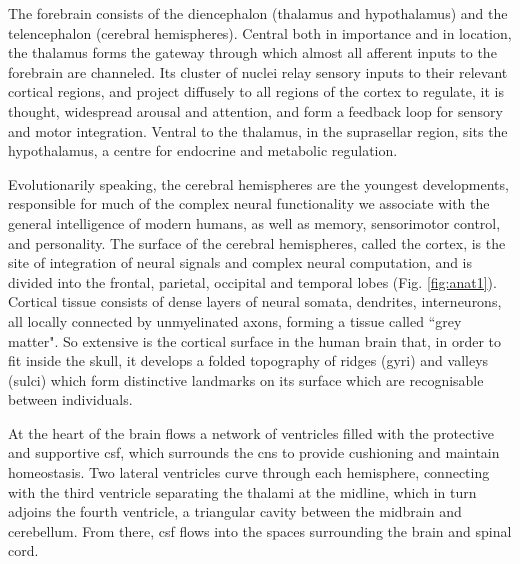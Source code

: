 \begin{SCfigure}[][h!]
  
  \caption[Macroscale subdivisions of the human brain]{Macroscale subdivisions of the human brain. Adapted from original by \citeauthor{Carter1918} (\citeyear{Carter1918}), public domain, via Wikimedia Commons.}
  \label{fig:anat1}
\end{SCfigure}

The forebrain consists of the diencephalon (thalamus and hypothalamus) and the telencephalon (cerebral hemispheres).
Central both in importance and in location, the thalamus forms the gateway through which almost all afferent inputs to the forebrain are channeled.
Its cluster of nuclei relay sensory inputs to their relevant cortical regions, and project diffusely to all regions of the cortex to regulate, it is thought, widespread arousal and attention, and form a feedback loop for sensory and motor integration.
Ventral to the thalamus, in the suprasellar region, sits the hypothalamus, a centre for endocrine and metabolic regulation.

Evolutionarily speaking, the cerebral hemispheres are the youngest developments, responsible for much of the complex neural functionality we associate with the general intelligence of modern humans, as well as memory, sensorimotor control, and personality.
The surface of the cerebral hemispheres, called the cortex, is the site of integration of neural signals and complex neural computation, and is divided into the frontal, parietal, occipital and temporal lobes (Fig. \ref{fig:anat1}).
Cortical tissue consists of dense layers of neural somata, dendrites, interneurons, all locally connected by unmyelinated axons, forming a tissue called ``grey matter".
So extensive is the cortical surface in the human brain that, in order to fit inside the skull, it develops a folded topography of ridges (gyri) and valleys (sulci) which form distinctive landmarks on its surface which are recognisable between individuals.

At the heart of the brain flows a network of ventricles filled with the protective and supportive \gls{csf}, which surrounds the \gls{cns} to provide cushioning and maintain homeostasis\autocite{Wichmann2022}.
Two lateral ventricles curve through each hemisphere, connecting with the third ventricle separating the thalami at the midline, which in turn adjoins the fourth ventricle, a triangular cavity between the midbrain and cerebellum.
From there, \gls{csf} flows into the spaces surrounding the brain and spinal cord.

